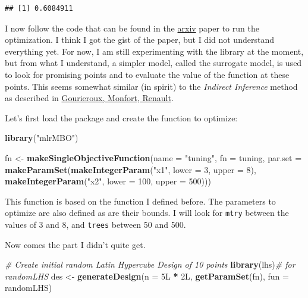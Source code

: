\documentclass[]{gitbook}
\newenvironment{Shaded}{\begin{snugshade}}{\end{snugshade}}
\newcommand{\CommentTok}[1]{\textcolor[rgb]{0.56,0.35,0.01}{\textit{#1}}}
\newcommand{\DataTypeTok}[1]{\textcolor[rgb]{0.13,0.29,0.53}{#1}}
\newcommand{\DecValTok}[1]{\textcolor[rgb]{0.00,0.00,0.81}{#1}}
\newcommand{\KeywordTok}[1]{\textcolor[rgb]{0.13,0.29,0.53}{\textbf{#1}}}
\newcommand{\NormalTok}[1]{#1}
\newcommand{\OperatorTok}[1]{\textcolor[rgb]{0.81,0.36,0.00}{\textbf{#1}}}
\newcommand{\StringTok}[1]{\textcolor[rgb]{0.31,0.60,0.02}{#1}}
\theoremstyle{definition}
\theoremstyle{definition}
\theoremstyle{definition}
\theoremstyle{remark}
\begin{document}
\begin{verbatim}
## [1] 0.6084911
\end{verbatim}

I now follow the code that can be found in the
\href{https://arxiv.org/abs/1703.03373}{arxiv} paper to run the
optimization. I think I got the gist of the paper, but I did not
understand everything yet. For now, I am still experimenting with the
library at the moment, but from what I understand, a simpler model,
called the surrogate model, is used to look for promising points and to
evaluate the value of the function at these points. This seems somewhat
similar (in spirit) to the \emph{Indirect Inference} method as described
in \href{https://www.jstor.org/stable/2285076}{Gourieroux, Monfort,
Renault}.

Let's first load the package and create the function to optimize:

\begin{Shaded}
\begin{Highlighting}[]
\KeywordTok{library}\NormalTok{(}\StringTok{"mlrMBO"}\NormalTok{)}
\end{Highlighting}
\end{Shaded}

\begin{Shaded}
\begin{Highlighting}[]
\NormalTok{fn <-}\StringTok{ }\KeywordTok{makeSingleObjectiveFunction}\NormalTok{(}\DataTypeTok{name =} \StringTok{"tuning"}\NormalTok{,}
                                 \DataTypeTok{fn =}\NormalTok{ tuning,}
                                 \DataTypeTok{par.set =} \KeywordTok{makeParamSet}\NormalTok{(}\KeywordTok{makeIntegerParam}\NormalTok{(}\StringTok{"x1"}\NormalTok{, }\DataTypeTok{lower =} \DecValTok{3}\NormalTok{, }\DataTypeTok{upper =} \DecValTok{8}\NormalTok{),}
                                                        \KeywordTok{makeIntegerParam}\NormalTok{(}\StringTok{"x2"}\NormalTok{, }\DataTypeTok{lower =} \DecValTok{100}\NormalTok{, }\DataTypeTok{upper =} \DecValTok{500}\NormalTok{)))}
\end{Highlighting}
\end{Shaded}

This function is based on the function I defined before. The parameters
to optimize are also defined as are their bounds. I will look for
\texttt{mtry} between the values of 3 and 8, and \texttt{trees} between
50 and 500.

Now comes the part I didn't quite get.

\begin{Shaded}
\begin{Highlighting}[]
\CommentTok{# Create initial random Latin Hypercube Design of 10 points}
\KeywordTok{library}\NormalTok{(lhs)}\CommentTok{# for randomLHS}
\NormalTok{des <-}\StringTok{ }\KeywordTok{generateDesign}\NormalTok{(}\DataTypeTok{n =}\NormalTok{ 5L }\OperatorTok{*}\StringTok{ }\NormalTok{2L, }\KeywordTok{getParamSet}\NormalTok{(fn), }\DataTypeTok{fun =}\NormalTok{ randomLHS)}
\end{Highlighting}
\end{Shaded}
\end{document}
